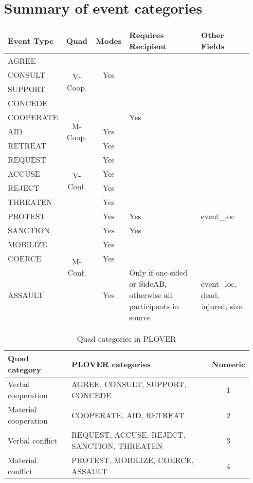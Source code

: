 \documentclass[11pt]{report}
\begin{document}
{%

\section{Summary of event categories }

\begin{tabular}{lccp{1.5in}p{1.2in}}
\toprule
Event Type & Quad & Modes & Requires Recipient & Other Fields \\
\midrule
AGREE & \multirow{4}{*}{V-Coop.} \\
CONSULT &  & Yes \\
SUPPORT & \\
CONCEDE  & \\
\midrule
COOPERATE & \multirow{3}{*}{M-Coop.} & 	& Yes \\
AID & & Yes \\
RETREAT & & Yes \\
\midrule
REQUEST & \multirow{4}{*}{V-Conf.} & Yes  \\
ACCUSE & & Yes \\
REJECT & & Yes\\
THREATEN & & Yes \\
\midrule
PROTEST & \multirow{5}{*}{M-Conf.} & Yes 	& Yes & event\_loc \\
SANCTION & & Yes 			& Yes \\
MOBILIZE & & Yes \\
COERCE && Yes \\
ASSAULT && Yes & Only if one-sided or SideAB, otherwise all participants in source & event\_loc, dead, injured, size \\
\bottomrule
\end{tabular}

\begin{table}[htp]
\caption{Quad categories in PLOVER}
\begin{center}
\begin{tabular}{|l|l|c|}
\hline
Quad category & PLOVER categories & Numeric\\
\hline
Verbal cooperation & AGREE, CONSULT, SUPPORT, CONCEDE &  1 \\
Material cooperation & COOPERATE, AID, RETREAT & 2 \\
Verbal conflict & REQUEST, ACCUSE, REJECT, SANCTION, THREATEN & 3\\
Material conflict & PROTEST,  MOBILIZE, COERCE, ASSAULT & 4\\
\hline

\end{tabular}
\end{center}
\label{default}
\end{table}

}
\end{document}
